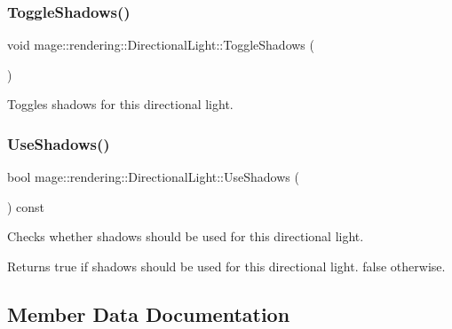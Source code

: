 \subsubsection{\texorpdfstring{Toggle\+Shadows()}{ToggleShadows()}}
{\footnotesize\ttfamily void mage\+::rendering\+::\+Directional\+Light\+::\+Toggle\+Shadows (\begin{DoxyParamCaption}{ }\end{DoxyParamCaption})\hspace{0.3cm}{\ttfamily [noexcept]}}

Toggles shadows for this directional light. \hypertarget{classmage_1_1rendering_1_1_directional_light_a129904147256d111ec56cc3ddc502157}{}\label{classmage_1_1rendering_1_1_directional_light_a129904147256d111ec56cc3ddc502157} 
\subsubsection{\texorpdfstring{Use\+Shadows()}{UseShadows()}}
{\footnotesize\ttfamily bool mage\+::rendering\+::\+Directional\+Light\+::\+Use\+Shadows (\begin{DoxyParamCaption}{ }\end{DoxyParamCaption}) const\hspace{0.3cm}{\ttfamily [noexcept]}}

Checks whether shadows should be used for this directional light.

\begin{DoxyReturn}{Returns}
{\ttfamily true} if shadows should be used for this directional light. {\ttfamily false} otherwise. 
\end{DoxyReturn}


\subsection{Member Data Documentation}
\hypertarget{classmage_1_1rendering_1_1_directional_light_a55d415fffd8f59f296e4d380639d3af1}{}\label{classmage_1_1rendering_1_1_directional_light_a55d415fffd8f59f296e4d380639d3af1} 
